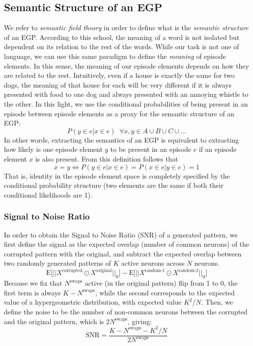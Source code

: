 \documentclass{article}
\begin{document}
\subsection*{Semantic Structure of an EGP}
We refer to  \textit{semantic field theory}  in order to define what is the \textit{semantic structure} of an EGP. According to this school, the meaning of a word is not isolated but dependent on its relation to the rest of the words. While our task is not one of language, we can use this same paradigm to define the \textit{meaning} of episode elements. In this sense, the meaning of our episode elements depends on how they are related to the rest. Intuitively, even if a house is exactly the same for two dogs, the meaning of that house for each will be very different if it is always presented with food to one dog and always presented with an annoying whistle to the other.
\newline\newline
In this light, we use the conditional probabilities of being present in an episode between episode elements as a proxy for the semantic structure of an EGP:
\begin{equation}
    P(y \in e | x \in e) \;\; \forall x, y \in A\cup B\cup C\cup ...
\end{equation}
In other words, extracting the semantics of an EGP is equivalent to extracting how likely is one episode element $y$ to be present in an episode $e$ if an episode element $x$ is also present. From this definition follows that
\begin{equation}
    x = y \Longleftrightarrow P(y \in e | x \in e) = P(x \in e | y \in e) = 1
\end{equation}
That is, identity in the episode element space is completely specified by the conditional probability structure (two elements are the same if both their conditional likelihoods are 1).
\subsubsection*{Signal to Noise Ratio}
In order to obtain the Signal to Noise Ratio (SNR) of a generated pattern, we first define the signal as the expected overlap (number of common neurons) of the corrupted pattern with the original, and subtract the expected overlap between two randomly generated patterns of $K$ active neurons across $N$ neurons. 
\begin{equation}
    \textrm{E}\Big[|| X^\textrm{corrupted} \odot X^\textrm{original}||_0\Big] - \textrm{E}\Big[|| X^\textrm{random-1} \odot X^\textrm{random-2}||_0\Big]
\end{equation}
Because we fix that $N^\textrm{swaps}$ active (in the original pattern) flip from 1 to 0, the first term is always $K - N^\textrm{swaps}$, while the second corresponds to the expected value of a hypergeometric distribution, with expected value $K^2/N$. Then, we define the noise to be the number of non-common neurons between the corrupted and the original pattern, which is $2N^\textrm{swaps}$, giving:
\begin{equation}
    \mathrm{SNR} = \frac{K - N^\textrm{swaps}- K^2/N}{2N^\textrm{swaps}}
\end{equation}
\end{document}
